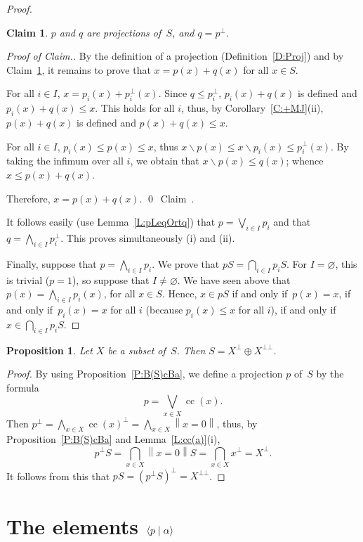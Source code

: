 \documentclass[psamsfonts,reqno]{memo-l}
\theoremstyle{plain}
\newtheorem{proposition}[lemma]{Proposition}
\newtheorem{claim}{Claim}
\theoremstyle{definition}
\theoremstyle{remark}
\newcommand{\qedc}{{\qed}~{\rm Claim~{\theclaim}.}}
\newenvironment{cproof}
{\begin{proof}[Proof of Claim.]}
{\qedc\renewcommand{\qed}{}\end{proof}}
\numberwithin{equation}{section}
\renewcommand{\iff}{if and only if}
\newcommand{\es}{\varnothing}
\newcommand{\sd}{\smallsetminus}
\newcommand{\scal}[2]{\left\langle\nobreak#1\nobreak\mid\nobreak#2
\nobreak\right\rangle}
\newcommand{\bv}[1]{\left\|#1\right\|}
\DeclareMathOperator{\cc}{cc}
\begin{document}
\begin{proof}
\begin{claim}\label{Cl:pperpq}
$p$ and $q$ are projections of~$S$, and $q=p^\bot$.
\end{claim}

\begin{cproof}
By the definition of a projection (Definition~\ref{D:Proj}) and by
Claim~\ref{Cl:pperpq}, it remains to prove that $x=p(x)+q(x)$ for all
$x\in S$.

For all $i\in I$, $x=p_i(x)+p_i^\bot(x)$. Since $q\leq p_i^\bot$,
$p_i(x)+q(x)$ is defined and $p_i(x)+q(x)\leq x$.
This holds for all $i$, thus, by Corollary~\ref{C:+MJ}(ii),
$p(x)+q(x)$ is defined and $p(x)+q(x)\leq x$.

For all $i\in I$, $p_i(x)\leq p(x)\leq x$, thus
$x\sd p(x)\leq x\sd p_i(x)\leq p_i^\bot(x)$. By taking the infimum over all
$i$, we obtain that $x\sd p(x)\leq q(x)$; whence $x\leq p(x)+q(x)$.

Therefore, $x=p(x)+q(x)$.
\end{cproof}

It follows easily (use Lemma~\ref{L:pLeqOrtq}) that $p=\bigvee_{i\in I}p_i$
and that $q=\bigwedge_{i\in I}p_i^\bot$. This proves simultaneously (i) and
(ii).

Finally, suppose that $p=\bigwedge_{i\in I}p_i$. We prove that
$pS=\bigcap_{i\in I}p_iS$. For $I=\es$, this is trivial ($p=1$), so suppose
that $I\ne\es$. We have seen above that $p(x)=\bigwedge_{i\in I}p_i(x)$, for
all $x\in S$. Hence, $x\in pS$ \iff\ $p(x)=x$, \iff\ $p_i(x)=x$ for all $i$
(because $p_i(x)\leq x$ for all $i$), \iff\ $x\in\bigcap_{i\in I}p_iS$.
\end{proof}

\begin{proposition}\label{P:Xbotbot}
Let $X$ be a subset of~$S$. Then $S=X^\bot\oplus X^{\bot\bot}$.
\end{proposition}

\begin{proof}
By using Proposition~\ref{P:B(S)cBa}, we define
a projection $p$ of~$S$ by the formula
   \[
   p=\bigvee_{x\in X}\cc(x).
   \]
Then $p^\bot=\bigwedge_{x\in X}\cc(x)^\bot=\bigwedge_{x\in X}\bv{x=0}$,
thus, by Proposition~\ref{P:B(S)cBa} and Lemma~\ref{L:cc(a)}(i),
   \[
   p^\bot S=\bigcap_{x\in X}\bv{x=0}S=\bigcap_{x\in X}x^\bot=X^\bot.
   \]
It follows from this that $pS=(p^\bot S)^\bot=X^{\bot\bot}$.
\end{proof}

\section{The elements $\scal{p}{\alpha}$}\label{S:alphap}
\end{document}

